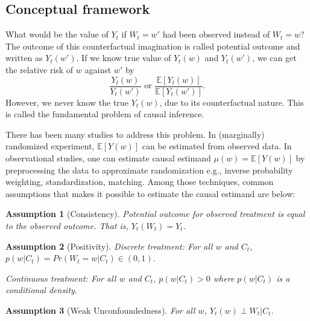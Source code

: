 \documentclass[12pt]{article}
\newtheorem{asm}{Assumption}
\begin{document}
\subsection{Conceptual framework}

What would be the value of $Y_t$ if $W_t = w'$ had been observed instead of $W_t = w$?
The outcome of this counterfactual imagination is called potential outcome and written as $Y_t(w')$.
If we know true value of $Y_t(w)$ and $Y_t(w')$, we can get the relative risk of $w$ against $w'$ by
\[
	\frac{Y_t(w)}{Y_t(w')} \text{ or } 
	\frac{\mathbb{E}\left[ Y_t(w) \right]}{\mathbb{E}\left[ Y_t(w') \right]}.
\]
However, we never know the true $Y_t(w)$, due to its counterfactual nature.
This is called the fundamental problem of causal inference\cite{holland1986}.

There has been many studies to address this problem.
In (marginally) randomized experiment, 
$\mathbb{E}[Y(w)]$ can be estimated from observed data\cite{rubin1974}.
In observational studies, 
one can estimate causal estimand $\mu(w) = \mathbb{E}[Y(w)]$ by preprocessing the data to approximate randomization 
e.g., inverse probability weighting, standardization, matching\cite{rosenbaum1983}.
Among those techniques, 
common assumptions that makes it possible to estimate the causal estimand are below:

\begin{asm}[Consistency]\hfill

	Potential outcome for observed treatment is equal to the observed outcome.
	That is, $Y_t(W_t) = Y_t$.
\end{asm}

\begin{asm}[Positivity]\hfill
	Discrete treatment:
	For all $w$ and $C_t$, $p(w\lvert C_t) = Pr\left ( W_t = w \lvert C_t\right ) \in (0, 1)$.

	Continuous treatment:
	For all $w$ and $C_t$, $p(w\lvert C_t) > 0$ where $p(w\lvert C_t)$ is a conditional density.
\end{asm}


\begin{asm}[Weak Unconfoundedness] \hfill

	For all $w$, $Y_{t}(w) \perp W_t \lvert C_t$.
\end{asm}
\end{document}
